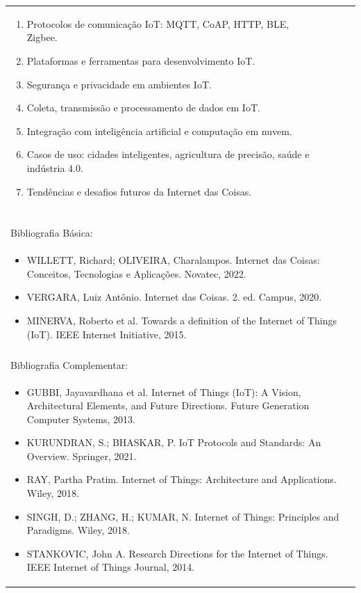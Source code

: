 \documentclass[11pt]{article}
\begin{document}
\begin{center}
\begin{longtable}{|p{4cm}|p{4cm}|p{4cm}|p{4cm}|}
{\begin{enumerate}
\item Protocolos de comunicação IoT: MQTT, CoAP, HTTP, BLE, Zigbee.
\item Plataformas e ferramentas para desenvolvimento IoT.
\item Segurança e privacidade em ambientes IoT.
\item Coleta, transmissão e processamento de dados em IoT.
\item Integração com inteligência artificial e computação em nuvem.
\item Casos de uso: cidades inteligentes, agricultura de precisão, saúde e indústria 4.0.
\item Tendências e desafios futuros da Internet das Coisas.\end{enumerate}}\\
\multicolumn{4}{|p{16cm}|}{}\\
\multicolumn{4}{|p{16cm}|}{}\\
\multicolumn{4}{|p{16cm}|}{\vspace{-1cm}}\\
\multicolumn{4}{|p{16cm}|}{}\\
\hline
\multicolumn{4}{|p{16cm}|}{Bibliografia Básica:}\\
\multicolumn{4}{|p{16cm}|}{%
\begin{itemize}\item WILLETT, Richard; OLIVEIRA, Charalampos. Internet das Coisas: Conceitos, Tecnologias e Aplicações. Novatec, 2022.
\item VERGARA, Luiz Antônio. Internet das Coisas. 2. ed. Campus, 2020.
\item MINERVA, Roberto et al. Towards a definition of the Internet of Things (IoT). IEEE Internet Initiative, 2015.\end{itemize}}\\
\multicolumn{4}{|p{16cm}|}{}\\
\hline
\multicolumn{4}{|p{16cm}|}{Bibliografia Complementar:}\\
\multicolumn{4}{|p{16cm}|}{%
\begin{itemize}\item GUBBI, Jayavardhana et al. Internet of Things (IoT): A Vision, Architectural Elements, and Future Directions. Future Generation Computer Systems, 2013.
\item KURUNDRAN, S.; BHASKAR, P. IoT Protocols and Standards: An Overview. Springer, 2021.
\item RAY, Partha Pratim. Internet of Things: Architecture and Applications. Wiley, 2018.
\item SINGH, D.; ZHANG, H.; KUMAR, N. Internet of Things: Principles and Paradigms. Wiley, 2018.
\item STANKOVIC, John A. Research Directions for the Internet of Things. IEEE Internet of Things Journal, 2014.\end{itemize}}\\
\hline
\end{longtable}
\end{center}
\end{document}
